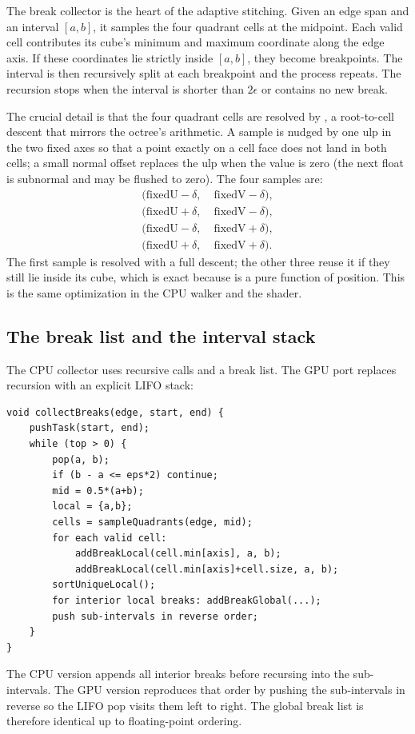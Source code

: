 The break collector is the heart of the adaptive stitching.  Given an edge
span and an interval $[a,b]$, it samples the four quadrant cells at the
midpoint.  Each valid cell contributes its cube's minimum and maximum
coordinate along the edge axis.  If these coordinates lie strictly inside
$[a,b]$, they become breakpoints.  The interval is then recursively split
at each breakpoint and the process repeats.  The recursion stops when the
interval is shorter than $2\epsilon$ or contains no new break.

The crucial detail is that the four quadrant cells are resolved by
, a root-to-cell descent that mirrors the octree's
 arithmetic.  A sample is nudged by one ulp in the two
fixed axes so that a point exactly on a cell face does not land in both
cells; a small normal offset replaces the ulp when the value is zero (the
next float is subnormal and may be flushed to zero).  The four samples are:
\begin{align}
  (\text{fixedU}-\delta,\;& \text{fixedV}-\delta),\\
  (\text{fixedU}+\delta,\;& \text{fixedV}-\delta),\\
  (\text{fixedU}-\delta,\;& \text{fixedV}+\delta),\\
  (\text{fixedU}+\delta,\;& \text{fixedV}+\delta).
\end{align}
The first sample is resolved with a full descent; the other three reuse it
if they still lie inside its cube, which is exact because 
is a pure function of position.  This is the same optimization in the CPU
walker and the shader.

\subsection{The break list and the interval stack}

The CPU collector uses recursive calls and a 
break list.  The GPU port replaces recursion with an explicit LIFO stack:
\begin{lstlisting}[style=glsl,caption={The GPU break collector (shape).},label={lst:breaks}]
void collectBreaks(edge, start, end) {
    pushTask(start, end);
    while (top > 0) {
        pop(a, b);
        if (b - a <= eps*2) continue;
        mid = 0.5*(a+b);
        local = {a,b};
        cells = sampleQuadrants(edge, mid);
        for each valid cell:
            addBreakLocal(cell.min[axis], a, b);
            addBreakLocal(cell.min[axis]+cell.size, a, b);
        sortUniqueLocal();
        for interior local breaks: addBreakGlobal(...);
        push sub-intervals in reverse order;
    }
}
\end{lstlisting}
The CPU version appends all interior breaks before recursing into the
sub-intervals.  The GPU version reproduces that order by pushing the
sub-intervals in reverse so the LIFO pop visits them left to right.  The
global break list is therefore identical up to floating-point ordering.

